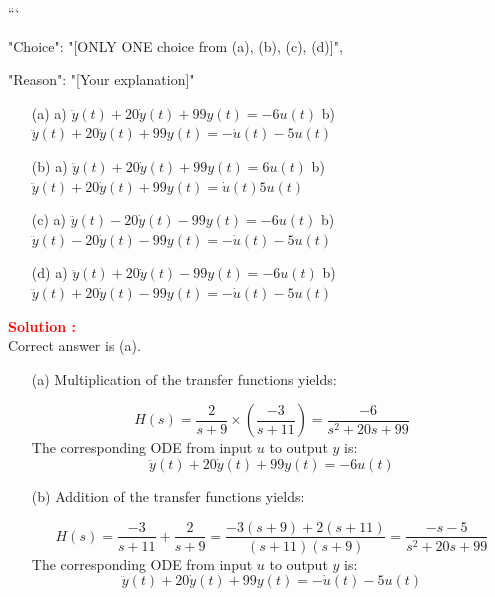 \documentclass[12pt]{article}
\begin{document}
```
{

"Choice": "[ONLY ONE choice from (a), (b), (c), (d)]",

"Reason": "[Your explanation]"

}

\begin{itemize}
    \item[(a)] a) \(\ddot{y}(t) + 20\dot{y}(t) + 99y(t) = -6u(t)\) b) \(\ddot{y}(t) + 20\dot{y}(t) + 99y(t) = -\dot{u}(t) - 5u(t)\)
    \item[(b)] a) \(\ddot{y}(t) + 20\dot{y}(t) + 99y(t) = 6u(t)\) b) \(\ddot{y}(t) + 20\dot{y}(t) + 99y(t) = \dot{u}(t)  5u(t)\)
    \item[(c)] a) \(\ddot{y}(t) - 20\dot{y}(t) - 99y(t) = -6u(t)\) b) \(\ddot{y}(t) - 20\dot{y}(t) - 99y(t) = -\dot{u}(t) - 5u(t)\)
    \item[(d)] a) \(\ddot{y}(t) + 20\dot{y}(t) - 99y(t) = -6u(t)\) b) \(\ddot{y}(t) + 20\dot{y}(t) - 99y(t) = -\dot{u}(t) - 5u(t)\)
\end{itemize}
\textbf{\textcolor{red}{Solution :}} \\
Correct answer is (a).\\
\begin{enumerate}
    \item[(a)] Multiplication of the transfer functions yields:

    \begin{equation}
    H(s) = \frac{2}{s + 9} \times \left(\frac{-3}{s + 11}\right) = \frac{-6}{s^2 + 20s + 99}
    \end{equation}
    The corresponding ODE from input \(u\) to output \(y\) is:
    \begin{equation}
    \ddot{y}(t) + 20\dot{y}(t) + 99y(t) = -6u(t)
    \end{equation}
    

    \item[(b)] Addition of the transfer functions yields:


    \begin{equation}
    H(s) = \frac{-3}{s + 11} + \frac{2}{s + 9} = \frac{-3(s + 9) + 2(s + 11)}{(s + 11)(s + 9)} = \frac{-s - 5}{s^2 + 20s + 99}
    \end{equation}
    The corresponding ODE from input \(u\) to output \(y\) is:
    \begin{equation}
    \ddot{y}(t) + 20\dot{y}(t) + 99y(t) = -\dot{u}(t) - 5u(t)
    \end{equation}
\end{enumerate}
\end{document}
